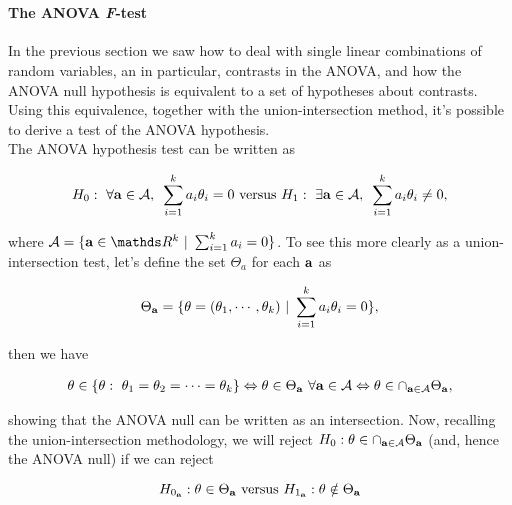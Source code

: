 \documentclass{homework}
\begin{document}
\blank \\

\paragraph{\textbf{The ANOVA \textit{F}-test}}

In the previous section we saw how to deal with single linear combinations of random variables, an in particular, contrasts in the ANOVA, and how the ANOVA null hypothesis is equivalent to a set of hypotheses about contrasts. Using this equivalence, together with the union-intersection method, it's possible to derive a test of the ANOVA hypothesis. \\

The ANOVA hypothesis test can be written as 

\begin{align*}
    H_0: \textnormal{ } \forall {\bf a} \in \mathcal{A}, \textnormal{ } \sum_{i=1}^{k} a_i \theta_i = 0 \textnormal{ versus } H_1: \textnormal{ } \exists {\bf a} \in \mathcal{A}, \textnormal{ } \sum_{i=1}^{k} a_i \theta_i \neq 0,
\end{align*}

where $\mathcal{A} = \{{\bf a} \in \R^{k} \blank | \blank \sum_{i=1}^{k} a_i = 0\}$. To see this more clearly as a union-intersection test, let's define the set $\Theta_a$ for each ${\bf a}$ as 

$$
\Theta_{\bf a} = \{\theta=(\theta_1, \cdots, \theta_k) \textnormal{ } | \textnormal{ } \sum_{i=1}^{k}a_i \theta_i = 0\},
$$

then we have 

\begin{align*}
    \theta \in \{\theta: \textnormal{ } \theta_1 = \theta_2 = \cdots =  \theta_k \} \Leftrightarrow \theta \in \Theta_{\bf a} \textnormal{ } \forall {\bf a} \in \mathcal{A} \Leftrightarrow \theta \in \cap_{{\bf a} \in \mathcal{A}} \Theta_{\bf a},
\end{align*}

showing that the ANOVA null can be written as an intersection. Now, recalling the union-intersection methodology, we will reject $H_0 : \theta \in \cap_{{\bf a} \in \mathcal{A}} \Theta_{\bf a}$ (and, hence the ANOVA null) if we can reject 

$$
H_{0_{\bf a}} : \theta \in \Theta_{\bf a} \textnormal{ versus } H_{1_{\bf a}} : \theta \notin \Theta_{\bf a}
$$
\end{document}
